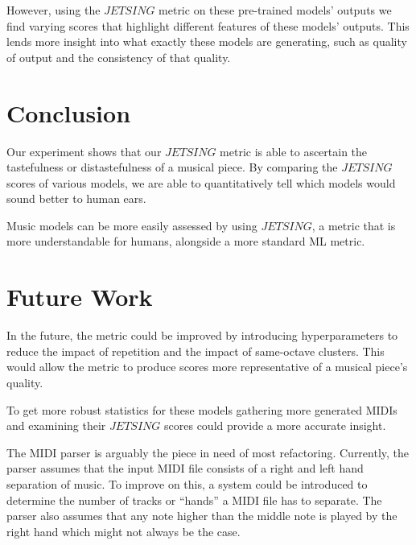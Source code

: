 \documentclass[11pt]{article}
\begin{document}
However, using the $JETSING$ metric on these pre-trained models' outputs we find varying scores that highlight different features of these models' outputs.
This lends more insight into what exactly these models are generating, such as quality of output and the consistency of that quality.

\section{Conclusion}

Our experiment shows that our $JETSING$ metric is able to ascertain the tastefulness or distastefulness of a musical piece.
By comparing the $JETSING$ scores of various models, we are able to quantitatively tell which models would sound better to human ears.

Music models can be more easily assessed by using $JETSING$, a metric that is more understandable for humans, alongside a more standard ML metric.

\section{Future Work}

In the future, the metric could be improved by introducing hyperparameters to reduce the impact of repetition and the impact of same-octave clusters.
This would allow the metric to produce scores more representative of a musical piece's quality.

To get more robust statistics for these models gathering more generated MIDIs and examining their $JETSING$ scores could provide a more accurate insight.

The MIDI parser is arguably the piece in need of most refactoring.
Currently, the parser assumes that the input MIDI file consists of a right and left hand separation of music.
To improve on this, a system could be introduced to determine the number of tracks or “hands” a MIDI file has to separate.
The parser also assumes that any note higher than the middle note is played by the right hand which might not always be the case.




\nocite{huang2018music, kotecha2018generating, vaswani2017attention, zhao2020verticalhorizontal, performance-rnn-2017, musicVAE}
\end{document}
